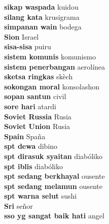 \textbf{ sikap waspada  } kuidou \\
\textbf{ silang kata  } krusigrama \\
\textbf{ simpanan wain  } bodega \\
\textbf{ Sion  } Israel \\
\textbf{ sisa-sisa  } puiru \\
\textbf{ sistem komunis  } komunismo \\
\textbf{ sistem penerbangan  } aerolínea \\
\textbf{ sketsa ringkas  } skèch \\
\textbf{ sokongan moral  } konsolashon \\
\textbf{ sopan santun  } civil \\
\textbf{ sore hari  } atardi \\
\textbf{ Soviet Russia  } Rusia \\
\textbf{ Soviet Union  } Rusia \\
\textbf{ Spain  } Spaña \\
\textbf{ spt dewa  } dibino \\
\textbf{ spt dirasuk syaitan  } diabóliko \\
\textbf{ spt iblis  } diabóliko \\
\textbf{ spt sedang berkhayal  } ousente \\
\textbf{ spt sedang melamun  } ousente \\
\textbf{ spt warna selut  } sushi \\
\textbf{ Sri  } señor \\
\textbf{ sso yg sangat baik hati  } angel \\
